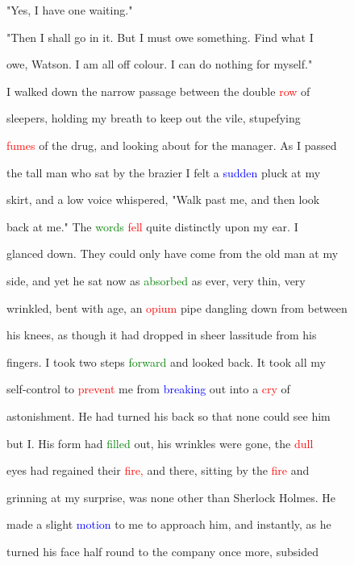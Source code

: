  "Yes, I have one \textcolor{BurntOrange}{waiting."}



 "Then I shall go in it. But I must owe something. Find what I

 owe, Watson. I am all off colour. I can do nothing for myself."



 I walked down the narrow passage between the double \textcolor{red}{row} of

 sleepers, holding my breath to keep out the vile, stupefying

 \textcolor{red}{fumes} of the drug, and looking about for the manager. As I passed

 the tall man who sat by the brazier I felt a \textcolor{blue}{sudden} pluck at my

 skirt, and a low voice whispered, "Walk past me, and then look

 back at me." The \textcolor{green}{words} \textcolor{red}{fell} quite distinctly upon my ear. I

 glanced down. They could only have come from the old man at my

 side, and yet he sat now as \textcolor{green}{absorbed} as ever, very thin, very

 wrinkled, bent with age, an \textcolor{red}{opium} pipe dangling down from between

 his knees, as though it had dropped in sheer lassitude from his

 fingers. I took two steps \textcolor{green}{forward} and looked back. It took all my

 self-control to \textcolor{red}{prevent} me from \textcolor{blue}{breaking} out into a \textcolor{red}{cry} of

 \textcolor{BurntOrange}{astonishment.} He had turned his back so that none could see him

 but I. His form had \textcolor{green}{filled} out, his wrinkles were gone, the \textcolor{red}{dull}

 eyes had regained their \textcolor{red}{fire,} and there, sitting by the \textcolor{red}{fire} and

 \textcolor{BurntOrange}{grinning} at my \textcolor{BurntOrange}{surprise,} was none other than Sherlock Holmes. He

 made a slight \textcolor{blue}{motion} to me to approach him, and instantly, as he

 turned his face half round to the company once more, subsided

